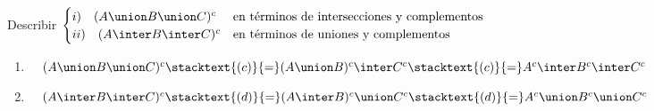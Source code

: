 \ejercicio
Describir
$
	\begin{cases}
		i) \quad (A \union B \union C)^c  & \text{en términos de intersecciones y complementos} \\
		ii) \quad (A \inter B \inter C)^c & \text{en términos de uniones y complementos}        \\
	\end{cases}
$
\begin{enumerate}[label=\roman*)]
	\item $\quad (A \union B \union C)^c \stacktext{(c)}{=} (A \union B)^c \inter C^c \stacktext{(c)}{=} A^c \inter B^c \inter C^c$
	\item $\quad (A \inter B \inter C)^c \stacktext{(d)}{=} (A \inter B)^c \union C^c \stacktext{(d)}{=} A^c \union B^c \union C^c$
\end{enumerate}
\\
